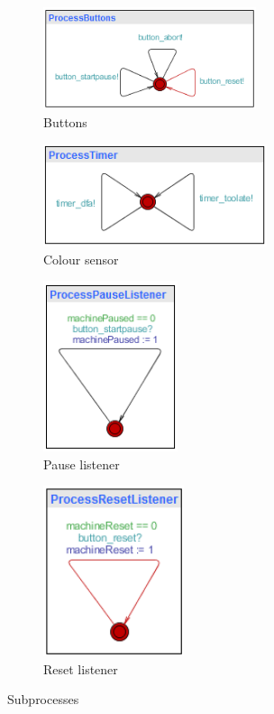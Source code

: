 \documentclass[a4paper,oneside,11pt]{article}
\begin{document}
\begin{figure}
\begin{subfigure}{0.45\textwidth}
\centering
\includegraphics[height=30mm]{processbuttons}
\caption{Buttons}
\end{subfigure}
\hfill
\begin{subfigure}{0.45\textwidth}
\centering
\includegraphics[height=30mm]{processtimer}
\caption{Colour sensor}
\end{subfigure}

\begin{subfigure}{0.45\textwidth}
\centering
\includegraphics[height=50mm]{processpauselistener}
\caption{Pause listener}
\end{subfigure}
\hfill
\begin{subfigure}{0.45\textwidth}
\centering
\includegraphics[height=50mm]{processresetlistener}
\caption{Reset listener}
\end{subfigure}
\caption{Subprocesses}
\end{figure}
\end{document}
